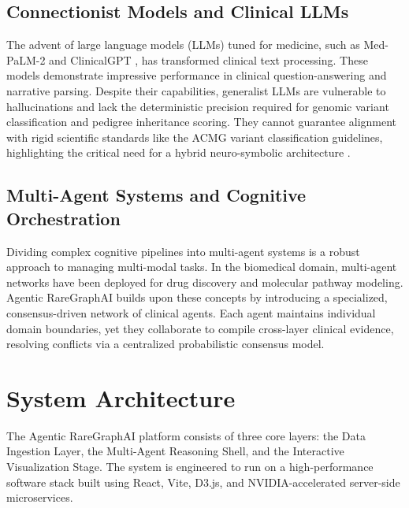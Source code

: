 \documentclass[conference]{IEEEtran}
\begin{document}
\subsection{Connectionist Models and Clinical LLMs}
The advent of large language models (LLMs) tuned for medicine, such as Med-PaLM-2 \cite{ref5} and ClinicalGPT \cite{ref11}, has transformed clinical text processing. These models demonstrate impressive performance in clinical question-answering and narrative parsing. Despite their capabilities, generalist LLMs are vulnerable to hallucinations and lack the deterministic precision required for genomic variant classification and pedigree inheritance scoring. They cannot guarantee alignment with rigid scientific standards like the ACMG variant classification guidelines, highlighting the critical need for a hybrid neuro-symbolic architecture \cite{ref6}.

\subsection{Multi-Agent Systems and Cognitive Orchestration}
Dividing complex cognitive pipelines into multi-agent systems is a robust approach to managing multi-modal tasks. In the biomedical domain, multi-agent networks have been deployed for drug discovery and molecular pathway modeling. Agentic RareGraphAI builds upon these concepts by introducing a specialized, consensus-driven network of clinical agents. Each agent maintains individual domain boundaries, yet they collaborate to compile cross-layer clinical evidence, resolving conflicts via a centralized probabilistic consensus model.

\section{System Architecture}
The Agentic RareGraphAI platform consists of three core layers: the Data Ingestion Layer, the Multi-Agent Reasoning Shell, and the Interactive Visualization Stage. The system is engineered to run on a high-performance software stack built using React, Vite, D3.js, and NVIDIA-accelerated server-side microservices.
\end{document}
